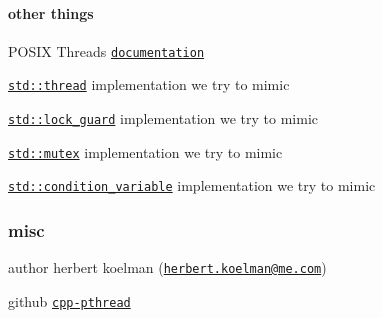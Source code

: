 \paragraph*{other things}


\begin{DoxyItemize}
\item P\+O\+S\+I\+X Threads \href{http://pubs.opengroup.org/onlinepubs/007908799/xsh/threads.html}{\tt documentation}
\item \href{http://en.cppreference.com/w/cpp/thread/thread}{\tt std\+::thread} implementation we try to mimic
\item \href{http://en.cppreference.com/w/cpp/thread/lock_guard/lock_guard}{\tt std\+::lock\+\_\+guard} implementation we try to mimic
\item \href{http://en.cppreference.com/w/cpp/thread/mutex}{\tt std\+::mutex} implementation we try to mimic
\item \href{http://en.cppreference.com/w/cpp/thread/condition_variable}{\tt std\+::condition\+\_\+variable} implementation we try to mimic
\end{DoxyItemize}

\subsubsection*{misc}


\begin{DoxyItemize}
\item author herbert koelman (\href{mailto:herbert.koelman@me.com}{\tt herbert.\+koelman@me.\+com})
\item github \href{https://github.com/HerbertKoelman/cpp-pthread}{\tt cpp-\/pthread} 
\end{DoxyItemize}